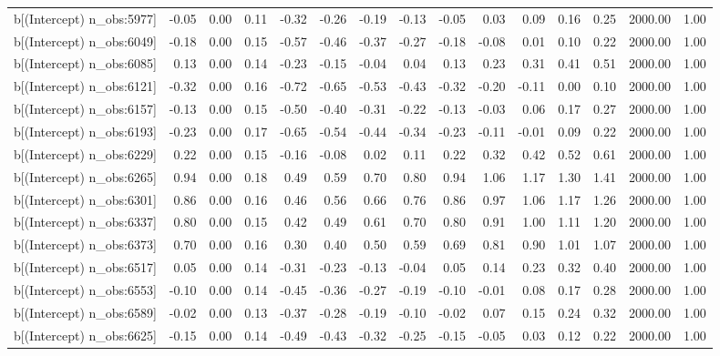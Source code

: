 \begin{table}[ht]
\begin{tabular}{rrrrrrrrrrrrrrr}
  b[(Intercept) n\_obs:5977] & -0.05 & 0.00 & 0.11 & -0.32 & -0.26 & -0.19 & -0.13 & -0.05 & 0.03 & 0.09 & 0.16 & 0.25 & 2000.00 & 1.00 \\ 
  b[(Intercept) n\_obs:6049] & -0.18 & 0.00 & 0.15 & -0.57 & -0.46 & -0.37 & -0.27 & -0.18 & -0.08 & 0.01 & 0.10 & 0.22 & 2000.00 & 1.00 \\ 
  b[(Intercept) n\_obs:6085] & 0.13 & 0.00 & 0.14 & -0.23 & -0.15 & -0.04 & 0.04 & 0.13 & 0.23 & 0.31 & 0.41 & 0.51 & 2000.00 & 1.00 \\ 
  b[(Intercept) n\_obs:6121] & -0.32 & 0.00 & 0.16 & -0.72 & -0.65 & -0.53 & -0.43 & -0.32 & -0.20 & -0.11 & 0.00 & 0.10 & 2000.00 & 1.00 \\ 
  b[(Intercept) n\_obs:6157] & -0.13 & 0.00 & 0.15 & -0.50 & -0.40 & -0.31 & -0.22 & -0.13 & -0.03 & 0.06 & 0.17 & 0.27 & 2000.00 & 1.00 \\ 
  b[(Intercept) n\_obs:6193] & -0.23 & 0.00 & 0.17 & -0.65 & -0.54 & -0.44 & -0.34 & -0.23 & -0.11 & -0.01 & 0.09 & 0.22 & 2000.00 & 1.00 \\ 
  b[(Intercept) n\_obs:6229] & 0.22 & 0.00 & 0.15 & -0.16 & -0.08 & 0.02 & 0.11 & 0.22 & 0.32 & 0.42 & 0.52 & 0.61 & 2000.00 & 1.00 \\ 
  b[(Intercept) n\_obs:6265] & 0.94 & 0.00 & 0.18 & 0.49 & 0.59 & 0.70 & 0.80 & 0.94 & 1.06 & 1.17 & 1.30 & 1.41 & 2000.00 & 1.00 \\ 
  b[(Intercept) n\_obs:6301] & 0.86 & 0.00 & 0.16 & 0.46 & 0.56 & 0.66 & 0.76 & 0.86 & 0.97 & 1.06 & 1.17 & 1.26 & 2000.00 & 1.00 \\ 
  b[(Intercept) n\_obs:6337] & 0.80 & 0.00 & 0.15 & 0.42 & 0.49 & 0.61 & 0.70 & 0.80 & 0.91 & 1.00 & 1.11 & 1.20 & 2000.00 & 1.00 \\ 
  b[(Intercept) n\_obs:6373] & 0.70 & 0.00 & 0.16 & 0.30 & 0.40 & 0.50 & 0.59 & 0.69 & 0.81 & 0.90 & 1.01 & 1.07 & 2000.00 & 1.00 \\ 
  b[(Intercept) n\_obs:6517] & 0.05 & 0.00 & 0.14 & -0.31 & -0.23 & -0.13 & -0.04 & 0.05 & 0.14 & 0.23 & 0.32 & 0.40 & 2000.00 & 1.00 \\ 
  b[(Intercept) n\_obs:6553] & -0.10 & 0.00 & 0.14 & -0.45 & -0.36 & -0.27 & -0.19 & -0.10 & -0.01 & 0.08 & 0.17 & 0.28 & 2000.00 & 1.00 \\ 
  b[(Intercept) n\_obs:6589] & -0.02 & 0.00 & 0.13 & -0.37 & -0.28 & -0.19 & -0.10 & -0.02 & 0.07 & 0.15 & 0.24 & 0.32 & 2000.00 & 1.00 \\ 
  b[(Intercept) n\_obs:6625] & -0.15 & 0.00 & 0.14 & -0.49 & -0.43 & -0.32 & -0.25 & -0.15 & -0.05 & 0.03 & 0.12 & 0.22 & 2000.00 & 1.00 \\ 

\end{tabular}
\end{table}
